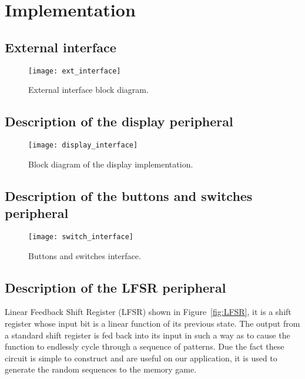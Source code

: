 \section{Implementation}
\label{sec:impl}

\subsection{External interface}
\begin{figure}[!htbp]
    \centerline{\texttt{[image: ext\_interface]}}
    \vspace{0cm}\caption{External interface block diagram.}
    \label{fig:ext_interface}
\end{figure}

\clearpage
\subsection{Description of the display peripheral}
\begin{figure}[!htbp]
    \centerline{\texttt{[image: display\_interface]}}
    \vspace{0cm}\caption{Block diagram of the display implementation.}
    \label{fig:display_interface}
\end{figure}

\clearpage
\subsection{Description of the buttons and switches peripheral}
\begin{figure}[!htbp]
    \centerline{\texttt{[image: switch\_interface]}}
    \vspace{0cm}\caption{Buttons and switches interface.}
    \label{fig:switch_interface}
\end{figure}

\subsection{Description of the LFSR peripheral}
Linear Feedback Shift Register (LFSR) shown in Figure~\ref{fig:LFSR}, it is a shift register 
whose input bit is a linear function of its previous state. The output from a standard shift register is fed back into its input in such a 
way as to cause the function to endlessly cycle through a sequence of patterns. Due the fact these circuit is simple to construct
and are useful on our application, it is used to generate the random sequences to the memory game.

